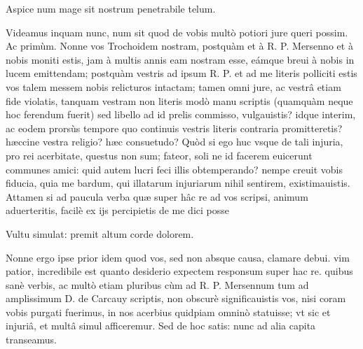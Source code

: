 \documentclass[11pt,a4paper]{article}
\begin{document}

Aspice num mage sit nostrum penetrabile telum.

Videamus inquam nunc, num sit quod de vobis multò potiori jure queri possim. Ac primùm. Nonne vos Trochoidem nostram, postquàm et à R. P. Mersenno et à nobis moniti estis, jam à multis annis eam nostram esse, eámque breui à nobis in lucem emittendam; postquàm vestris ad ipsum R. P. et ad me literis polliciti estis vos talem messem nobis relicturos intactam; tamen omni jure, ac vestrâ etiam fide violatis, tanquam vestram non literis modò manu scriptis (quamquàm neque hoc ferendum fuerit) sed libello ad id prelis commisso, vulgauistis? idque interim, ac eodem prorsùs tempore quo continuis vestris literis contraria promitteretis? hæccine vestra religio? hæc consuetudo? Quòd si ego huc vsque de tali injuria, pro rei acerbitate, \struck{\ill{}} questus non sum; fateor, soli ne id facerem euicerunt communes amici: quid autem lucri feci illis obtemperando? nempe creuit vobis fiducia, quia me bardum, qui illatarum injuriarum nihil sentirem, existimauistis. Attamen si ad paucula verba quæ super hâc re ad vos scripsi, animum aduerteritis, facilè ex ijs percipietis de me dici posse

Vultu simulat: premit altum corde dolorem.

Nonne ergo ipse prior idem quod vos, sed non absque causa, clamare debui. vim patior, incredibile est quanto desiderio expectem responsum super hac re. quibus sanè verbis, ac multò etiam pluribus cùm ad R. P. Mersennum tum ad amplissimum D. de Carcauy scriptis, non obscurè significauistis vos, nisi coram vobis purgati fuerimus, in nos acerbius quidpiam omninò statuisse; vt sic et injuriâ, et multâ simul afficeremur. Sed de hoc satis: nunc ad alia capita transeamus.
\end{document}
